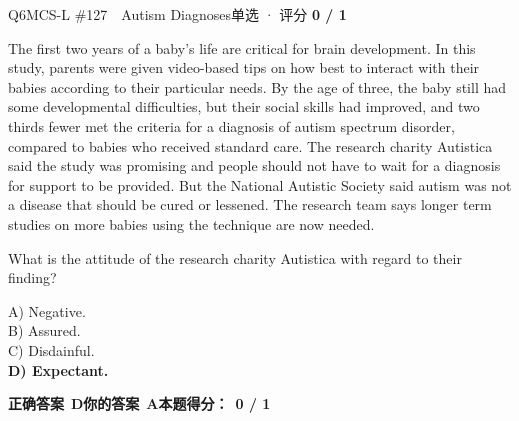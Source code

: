 \begin{qblock}{Q6\quad MCS-L \#127\ \ Autism Diagnoses}{单选 · 评分 \textcolor{cAccent}{\bfseries 0 / 1}}
\begin{promptbox}
The first two years of a baby's life are critical for brain development. In this study, parents were given video-based tips on how best to interact with their babies according to their particular needs. By the age of three, the baby still had some developmental difficulties, but their social skills had improved, and two thirds fewer met the criteria for a diagnosis of autism spectrum disorder, compared to babies who received standard care. The research charity Autistica said the study was promising and people should not have to wait for a diagnosis for support to be provided. But the National Autistic Society said autism was not a disease that should be cured or lessened. The research team says longer term studies on more babies using the technique are now needed.
\end{promptbox}
\begin{notebox}What is the attitude of the research charity Autistica with regard to their finding?\end{notebox}
{\small
A) Negative.\\
B) Assured.\\
C) Disdainful.\\
{\color{cFix}\textbf{D) Expectant.}}}
\par\smallskip
\textbf{正确答案}\ \textcolor{cFix}{\bfseries D}\qquad\textbf{你的答案}\ {\color{cWrong}\bfseries A}\qquad\textbf{本题得分：}\ {\color{cAccent}\bfseries 0 / 1}
\end{qblock}

